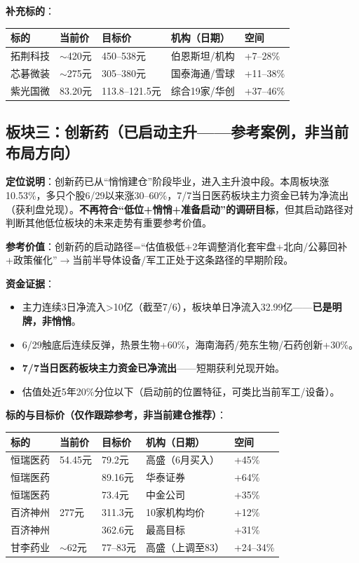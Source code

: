\documentclass[a4paper,11pt,fontset=none]{ctexart}
\begin{document}
\textbf{补充标的}：
\begin{tabularx}{\textwidth}{L{2.5cm}L{2cm}L{2.5cm}L{3cm}X}
\toprule
\textbf{标的} & \textbf{当前价} & \textbf{目标价} & \textbf{机构（日期）} & \textbf{空间} \\
\midrule
拓荆科技 & $\sim$420元 & 450--538元 & 伯恩斯坦/机构 & +7--28\% \\
芯碁微装 & $\sim$275元 & 305--380元 & 国泰海通/雪球 & +11--38\% \\
紫光国微 & 83.20元 & 113.8--121.5元 & 综合19家/华创 & +37--46\% \\
\bottomrule
\end{tabularx}

\subsection*{板块三：创新药（已启动主升——参考案例，非当前布局方向）}

\textbf{定位说明}：创新药已从``悄悄建仓''阶段毕业，进入主升浪中段。本周板块涨10.53\%，多只个股6/29以来涨30--60\%，7/7当日医药板块主力资金已转为净流出（获利盘兑现）。\textbf{不再符合``低位+悄悄+准备启动''的调研目标}，但其启动路径对判断其他低位板块的未来走势有重要参考价值。

\textbf{参考价值}：创新药的启动路径=``估值极低+2年调整消化套牢盘+北向/公募回补+政策催化''$\to$当前半导体设备/军工正处于这条路径的早期阶段。

\textbf{资金证据}：
\begin{itemize}
  \item 主力连续3日净流入>10亿（截至7/6），板块单日净流入32.99亿——\textbf{已是明牌，非悄悄}。
  \item 6/29触底后连续反弹，热景生物+60\%，海南海药/苑东生物/石药创新+30\%。
  \item \textbf{7/7当日医药板块主力资金已净流出}——短期获利兑现开始。
  \item 估值处近5年20\%分位以下（启动前的位置特征，可类比当前军工/设备）。
\end{itemize}

\textbf{标的与目标价（仅作跟踪参考，非当前建仓推荐）}：

\begin{tabularx}{\textwidth}{L{2.5cm}L{2cm}L{2.5cm}L{3cm}X}
\toprule
\textbf{标的} & \textbf{当前价} & \textbf{目标价} & \textbf{机构（日期）} & \textbf{空间} \\
\midrule
恒瑞医药 & 54.45元 & 79.2元 & 高盛（6月买入） & +45\% \\
恒瑞医药 & & 89.16元 & 华泰证券 & +64\% \\
恒瑞医药 & & 73.4元 & 中金公司 & +35\% \\
百济神州 & 277元 & 311.3元 & 10家机构均价 & +12\% \\
百济神州 & & 362.6元 & 最高目标 & +31\% \\
甘李药业 & $\sim$62元 & 77--83元 & 高盛（上调至83） & +24--34\% \\
\bottomrule
\end{tabularx}
\end{document}

